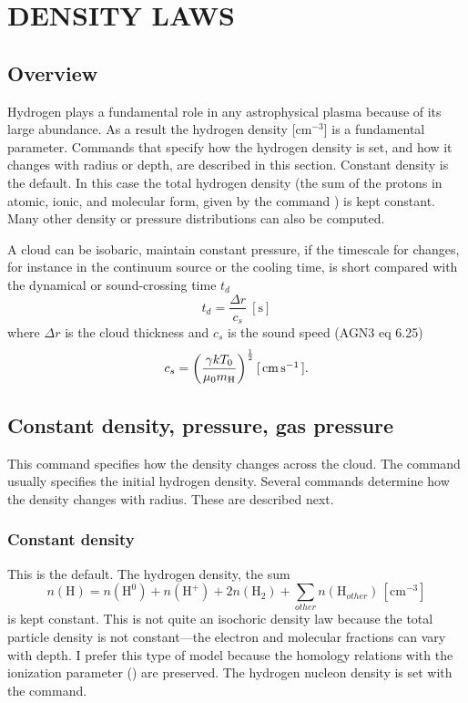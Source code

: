 \chapter{DENSITY LAWS}

\section{Overview}

Hydrogen plays a fundamental role in any astrophysical plasma because
of its large abundance.
As a result the hydrogen density [cm$^{-3}$] is a
fundamental parameter.
Commands that specify how the hydrogen density is
set, and how it changes with radius or depth, are described in this section.
Constant density is the default.  In this case the total hydrogen density
(the sum of the protons in atomic, ionic, and molecular form,
given by the
command ) is kept constant.
Many other
density or pressure distributions can also be computed.

A cloud can be isobaric, maintain constant pressure, if the timescale
for changes, for instance in the continuum source or the cooling time, is
short compared with the dynamical or sound-crossing time $t_d$
\begin{equation}
t_d  = \frac{{\Delta r}}{{c_s }}
\ [\mathrm{s}]
\end{equation}
where $\Delta r$ is the cloud thickness and $c_s$ is the sound speed
(AGN3 eq 6.25)
\begin{equation}
c_s  = \left( {\frac{{\gamma kT_0 }}{{\mu _0 m_{\mathrm{H}} }}}
\right)^{\frac{1}{2}}
 [\mbox{${\rm\thinspace cm}{\rm\thinspace s}^{-1}\,$} ].
\end{equation}

\section{Constant density, pressure, gas pressure}

This command specifies how the density changes across the cloud.
The
 command usually specifies the initial hydrogen density.
Several commands determine how the density changes with radius.
These are described next.

\subsection{Constant density}

This is the default.  The hydrogen density, the sum
\begin{equation}
n\left( {\mathrm{H}} \right) = n\left( {{\mathrm{H}}^{\mathrm{0}} } \right) + n\left(
{{\mathrm{H}}^ +  } \right) + 2n\left( {{\mathrm{H}}_2 } \right) +
\sum\limits_{other} {n\left( {{\mathrm{H}}_{other}^{} } \right)}
\,[\mathrm{cm}^{-3}]%
\end{equation}
is kept constant.
This is not quite an isochoric density law because the
total particle density is not constant---the electron and molecular
fractions can vary with depth.
I prefer this type of model because the
homology relations with the ionization parameter (\citealp{Davidson1977}) are
preserved.
The hydrogen nucleon density is set with the  command.

